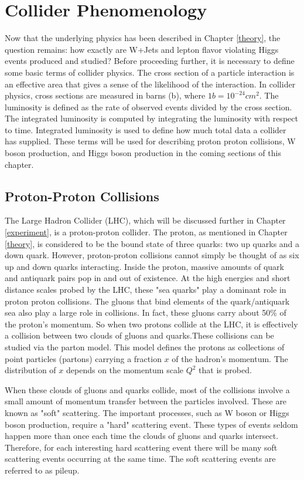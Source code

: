 \documentclass[oneside, letterpaper, oldfontcommands]{memoir}
\begin{document}
\chapter{Collider Phenomenology}\label{pheno}
Now that the underlying physics has been described in Chapter \ref{theory}, the question remains: how exactly are W+Jets and lepton flavor violating Higgs events produced and studied? Before proceeding further, it is necessary to define some basic terms of collider physics. The cross section of a particle interaction is an effective area that gives a sense of the likelihood of the interaction. In collider physics, cross sections are measured in barns (b), where $1b = 10^{-24}cm^{2}$. The luminosity is defined as the rate of observed events divided by the cross section. The integrated luminosity is computed by integrating the luminosity with respect to time. Integrated luminosity is used to define how much total data a collider has supplied. These terms will be used for describing proton proton collisions, W boson production, and Higgs boson production in the coming sections of this chapter.

\section{Proton-Proton Collisions}\label{ppcoll}
\qquad The Large Hadron Collider (LHC), which will be discussed further in Chapter \ref{experiment}, is a proton-proton collider. The proton, as mentioned in Chapter \ref{theory}, is considered to be the bound state of three quarks: two up quarks and a down quark. However, proton-proton collisions cannot simply be thought of as six up and down quarks interacting. Inside the proton, massive amounts of quark and antiquark pairs pop in and out of existence. At the high energies and short distance scales probed by the LHC, these "sea quarks" play a dominant role in proton proton collisions. The gluons that bind elements of the quark/antiquark sea also play a large role in collisions. In fact, these gluons carry about 50$\%$ of the proton's momentum\cite{Halzen:1984mc}. So when two protons collide at the LHC, it is effectively a collision between two clouds of gluons and quarks.These collisions can be studied via the parton model. This model defines the protons as collections of point particles (partons) carrying a fraction $x$ of the hadron's momentum. The distribution of $x$ depends on the momentum scale $Q^{2}$ that is probed. 

\qquad When these clouds of gluons and quarks collide, most of the collisions involve a small amount of momentum transfer between the particles involved. These are known as "soft" scattering. The important processes, such as W boson or Higgs boson production, require a "hard" scattering event. These types of events seldom happen more than once each time the clouds of gluons and quarks intersect. Therefore, for each interesting hard scattering event there will be many soft scattering events occurring at the same time. The soft scattering events are referred to as pileup. 
\end{document}
